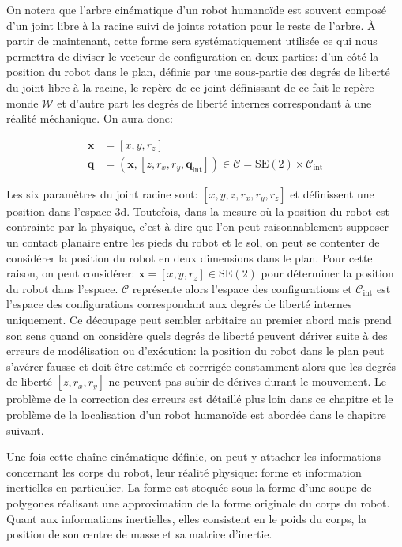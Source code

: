 On notera que l'arbre cinématique d'un robot humanoïde est souvent
composé d'un joint libre à la racine suivi de joints rotation pour le
reste de l'arbre. À partir de maintenant, cette forme sera
systématiquement utilisée ce qui nous permettra de diviser le vecteur
de configuration en deux parties: d'un côté la position du robot dans
le plan, définie par une sous-partie des degrés de liberté du joint
libre à la racine, le repère de ce joint définissant de ce fait le
repère monde $\mathcal{W}$ et d'autre part les degrés de liberté
internes correspondant à une réalité méchanique. On aura donc:

\begin{equation} \label{eq:chap2_configuration}
  \begin{aligned}
    \mathbf{x} &= [x, y, r_z]\\
    \mathbf{q} &= (\mathbf{x}, [z, r_x, r_y, \mathbf{q}_{\text{int}}])
    \in \mathcal{C} = \text{SE}(2) \times \mathcal{C}_{\text{int}}
  \end{aligned}
\end{equation}

Les six paramètres du joint racine sont: $[x, y, z, r_x, r_y, r_z]$ et
définissent une position dans l'espace 3d. Toutefois, dans la mesure
où la position du robot est contrainte par la physique, c'est à dire
que l'on peut raisonnablement supposer un contact planaire entre les
pieds du robot et le sol, on peut se contenter de considérer la
position du robot en deux dimensions dans le plan. Pour cette raison,
on peut considérer: $\mathbf{x} = [x, y, r_z] \in \text{SE}(2)$ pour
déterminer la position du robot dans l'espace. $\mathcal{C}$
représente alors l'espace des configurations et
$\mathcal{C}_{\text{int}}$ est l'espace des configurations
correspondant aux degrés de liberté internes uniquement. Ce découpage
peut sembler arbitaire au premier abord mais prend son sens quand on
considère quels degrés de liberté peuvent dériver suite à des erreurs
de modélisation ou d'exécution: la position du robot dans le plan peut
s'avérer fausse et doit être estimée et corrrigée constamment alors
que les degrés de liberté $[z, r_x, r_y]$ ne peuvent pas subir de
dérives durant le mouvement. Le problème de la correction des erreurs
est détaillé plus loin dans ce chapitre et le problème de la
localisation d'un robot humanoïde est abordée dans le chapitre
suivant.


Une fois cette chaîne cinématique définie, on peut y attacher les
informations concernant les corps du robot, leur réalité physique:
forme et information inertielles en particulier. La forme est stoquée
sous la forme d'une soupe de polygones réalisant une approximation de
la forme originale du corps du robot. Quant aux informations
inertielles, elles consistent en le poids du corps, la position de son
centre de masse et sa matrice d'inertie.


